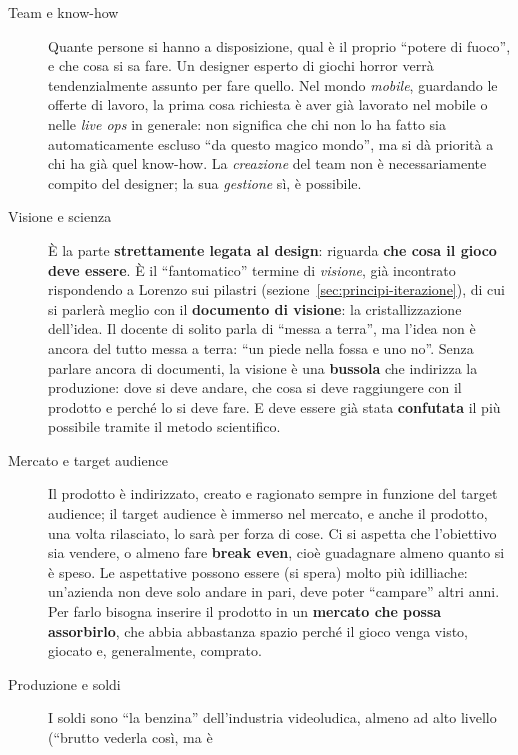 \begin{description}
  \item[Team e know-how] Quante persone si hanno a disposizione, qual è il
        proprio ``potere di fuoco'', e che cosa si sa fare. Un designer
        esperto di giochi horror verrà tendenzialmente assunto per fare
        quello. Nel mondo \emph{mobile}, guardando le offerte di lavoro, la
        prima cosa richiesta è aver già lavorato nel mobile o nelle
        \emph{live ops} in generale: non significa che chi non lo ha fatto sia
        automaticamente escluso ``da questo magico mondo'', ma si dà priorità
        a chi ha già quel know-how. La \emph{creazione} del team non è
        necessariamente compito del designer; la sua \emph{gestione} sì, è
        possibile.
  \item[Visione e scienza] È la parte \textbf{strettamente legata al
        design}: riguarda \textbf{che cosa il gioco deve essere}. È il
        ``fantomatico'' termine di \emph{visione}, già incontrato rispondendo
        a Lorenzo sui pilastri (sezione~\ref{sec:principi-iterazione}), di cui
        si parlerà meglio con il \textbf{documento di visione}: la
        cristallizzazione dell'idea. Il docente di solito parla di ``messa a
        terra'', ma l'idea non è ancora del tutto messa a terra: ``un piede
        nella fossa e uno no''. Senza parlare ancora di documenti, la visione
        è una \textbf{bussola} che indirizza la produzione: dove si deve
        andare, che cosa si deve raggiungere con il prodotto e perché lo si
        deve fare. E deve essere già stata \textbf{confutata} il più
        possibile tramite il metodo scientifico.
  \item[Mercato e target audience] Il prodotto è indirizzato, creato e
        ragionato sempre in funzione del target audience; il target audience
        è immerso nel mercato, e anche il prodotto, una volta rilasciato, lo
        sarà per forza di cose. Ci si aspetta che l'obiettivo sia vendere, o
        almeno fare \textbf{break even}, cioè guadagnare almeno quanto si è
        speso. Le aspettative possono essere (si spera) molto più idilliache:
        un'azienda non deve solo andare in pari, deve poter ``campare'' altri
        anni. Per farlo bisogna inserire il prodotto in un \textbf{mercato che
        possa assorbirlo}, che abbia abbastanza spazio perché il gioco venga
        visto, giocato e, generalmente, comprato.
  \item[Produzione e soldi] I soldi sono ``la benzina'' dell'industria
        videoludica, almeno ad alto livello (``brutto vederla così, ma è

\end{description}
